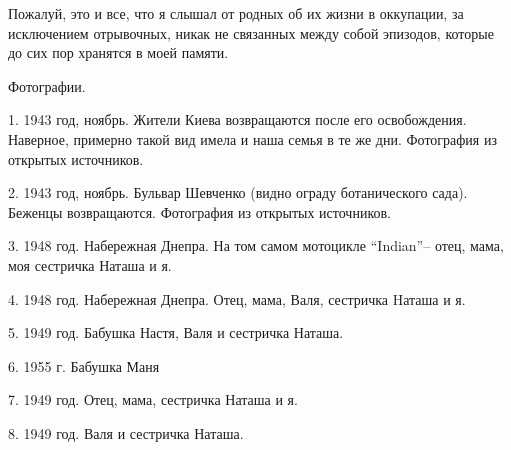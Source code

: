 
Пожалуй, это и все, что я слышал от родных об их жизни в оккупации, за
исключением отрывочных, никак не связанных между собой эпизодов, которые до сих
пор хранятся в моей памяти.

Фотографии. 

1. 1943 год, ноябрь. Жители Киева возвращаются после его освобождения.
Наверное, примерно такой вид имела и наша семья в те же дни.  Фотография из
открытых источников. 

2. 1943 год, ноябрь. Бульвар Шевченко (видно ограду ботанического сада).
Беженцы возвращаются. Фотография из открытых источников. 

3. 1948 год. Набережная Днепра. На том самом мотоцикле \enquote{Indian}–
отец, мама, моя сестричка Наташа и я. 

4. 1948 год. Набережная Днепра. Отец, мама, Валя, сестричка Hаташа и я. 

5. 1949 год. Бабушка Настя, Валя и сестричка Наташа. 

6. 1955 г. Бабушка Маня 

7. 1949 год. Отец, мама, сестричка Наташа и я.

8. 1949 год. Валя и сестричка Наташа.

